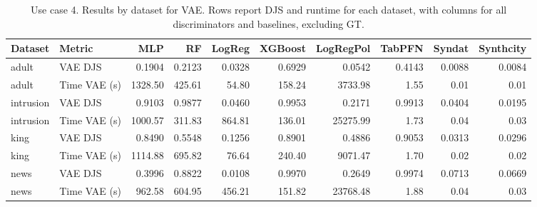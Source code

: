 \begin{table}[ht]
\centering
\small
\setlength{\tabcolsep}{3pt}
\caption{Use case 4. Results by dataset for VAE. Rows report DJS and runtime for each dataset, with columns for all discriminators and baselines, excluding GT.}
\label{tab:uc4_vae_by_classifier}
\begin{tabular}{llrrrrrrrr}
\toprule
Dataset & Metric & MLP & RF & LogReg & XGBoost & LogRegPol & TabPFN & Syndat & Synthcity \\
\midrule
adult & VAE DJS & 0.1904 & 0.2123 & 0.0328 & 0.6929 & 0.0542 & 0.4143 & 0.0088 & 0.0084 \\
adult & Time VAE (s) & 1328.50 & 425.61 & 54.80 & 158.24 & 3733.98 & 1.55 & 0.01 & 0.01 \\
intrusion & VAE DJS & 0.9103 & 0.9877 & 0.0460 & 0.9953 & 0.2171 & 0.9913 & 0.0404 & 0.0195 \\
intrusion & Time VAE (s) & 1000.57 & 311.83 & 864.81 & 136.01 & 25275.99 & 1.73 & 0.04 & 0.03 \\
king & VAE DJS & 0.8490 & 0.5548 & 0.1256 & 0.8901 & 0.4886 & 0.9053 & 0.0313 & 0.0296 \\
king & Time VAE (s) & 1114.88 & 695.82 & 76.64 & 240.40 & 9071.47 & 1.70 & 0.02 & 0.02 \\
news & VAE DJS & 0.3996 & 0.8822 & 0.0108 & 0.9970 & 0.2649 & 0.9974 & 0.0713 & 0.0669 \\
news & Time VAE (s) & 962.58 & 604.95 & 456.21 & 151.82 & 23768.48 & 1.88 & 0.04 & 0.03 \\
\bottomrule
\end{tabular}
\end{table}